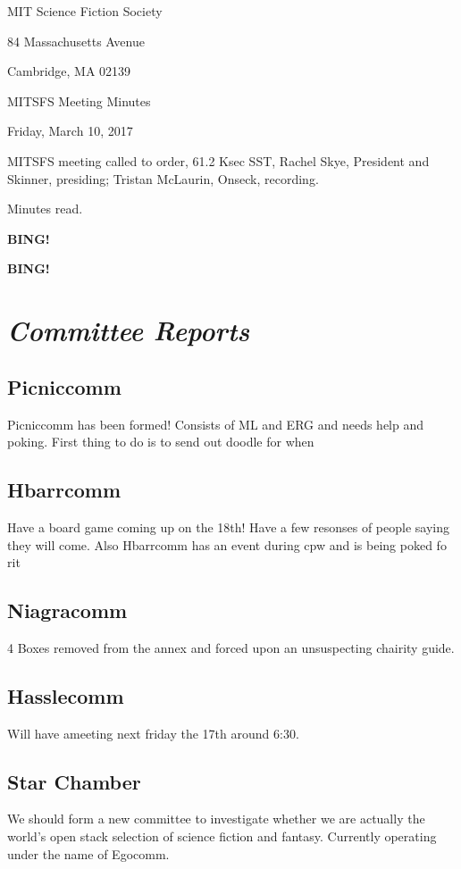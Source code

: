 \documentclass[10pt]{article}
\newcommand{\bing}{{\bf BING!} }
\newcommand{\goto}[1]{\bing \vskip 12pt \section*{{\em{#1}}}}
\newcommand{\skinner}{Rachel Skye, President and Skinner}
\newcommand{\onseck}{Tristan McLaurin, Onseck}
\newcommand{\meetingdate}{Friday, March 10, 2017}
\begin{document}
\begin{center}

MIT Science Fiction Society

84 Massachusetts Avenue

Cambridge, MA 02139

\vspace{12pt}

MITSFS Meeting Minutes

\meetingdate

\end{center}

\vspace{18pt}

\setlength{\parskip}{6pt}

\noindent
MITSFS meeting called to order, 61.2 Ksec SST,
\skinner, presiding; \onseck, recording.

Minutes read.

\bing

\goto{Committee Reports}
\subsection*{Picniccomm}
Picniccomm has been formed! Consists of ML and ERG and needs help and poking. First thing to do is to send out doodle for when

\subsection*{Hbarrcomm}
Have a board game coming up on the 18th! Have a few resonses of people saying they will come. 
Also Hbarrcomm has an event during cpw and is being poked fo rit

\subsection*{Niagracomm}
4 Boxes removed from the annex and forced upon an unsuspecting chairity guide. 

\subsection*{Hasslecomm} 
Will have ameeting next friday the 17th around 6:30.

\subsection*{Star Chamber}
We should form a new committee to investigate whether we are actually the world's open stack selection of science fiction and fantasy. Currently operating under the name of Egocomm.
\end{document}
